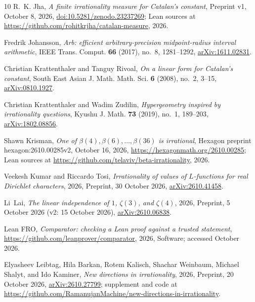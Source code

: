 \documentclass[11pt]{amsart}
\theoremstyle{definition}
\theoremstyle{remark}
\numberwithin{equation}{section}
\begin{document}
\begin{thebibliography}{10}
R.~K. Jha, \emph{A finite irrationality measure for {C}atalan's constant},
  Preprint v1, October 8, 2026,
  \href{https://doi.org/10.5281/zenodo.23237269}{doi:10.5281/zenodo.23237269};
  Lean sources at \url{https://github.com/rohitkrjha/catalan-measure}, 2026.

Fredrik Johansson, \emph{Arb: efficient arbitrary-precision midpoint-radius
  interval arithmetic}, IEEE Trans. Comput. \textbf{66} (2017), no.~8,
  1281--1292, \href{https://arxiv.org/abs/1611.02831}{arXiv:1611.02831}.

Christian Krattenthaler and Tanguy Rivoal, \emph{On a linear form for
  {C}atalan's constant}, South East Asian J. Math. Math. Sci. \textbf{6}
  (2008), no.~2, 3--15,
  \href{https://arxiv.org/abs/0810.1927}{arXiv:0810.1927}.

Christian Krattenthaler and Wadim Zudilin, \emph{Hypergeometry inspired by
  irrationality questions}, Kyushu J. Math. \textbf{73} (2019), no.~1,
  189--203, \href{https://arxiv.org/abs/1802.08856}{arXiv:1802.08856}.

Shawn Krisman, \emph{One of {$\beta(4),\beta(6),\ldots,\beta(36)$} is
  irrational}, Hexagon preprint hexagon:2610.00285v2, October 16, 2026,
  \url{https://hexagonmath.org/2610.00285}; Lean sources at
  \url{https://github.com/telaviv/beta-irrationality}, 2026.

Veekesh Kumar and Riccardo Tosi, \emph{Irrationality of values of
  {$L$}-functions for real {D}irichlet characters}, 2026, Preprint, 30 October
  2026, \href{https://arxiv.org/abs/2610.41458}{arXiv:2610.41458}.

Li~Lai, \emph{The linear independence of {$1$}, {$\zeta(3)$}, and
  {$\zeta(4)$}}, 2026, Preprint, 5 October 2026 (v2: 15 October 2026),
  \href{https://arxiv.org/abs/2610.06838}{arXiv:2610.06838}.

{Lean FRO}, \emph{Comparator: checking a {L}ean proof against a trusted
  statement}, \url{https://github.com/leanprover/comparator}, 2026, Software;
  accessed October 2026.

Elyasheev Leibtag, Hila Barkan, Rotem Kalisch, Shachar Weinbaum, Michael
  Shalyt, and Ido Kaminer, \emph{New directions in irrationality}, 2026,
  Preprint, 20 October 2026,
  \href{https://arxiv.org/abs/2610.27799}{arXiv:2610.27799}; supplement and
  code at
  \url{https://github.com/RamanujanMachine/new-directions-in-irrationality}.


\end{thebibliography}
\end{document}
